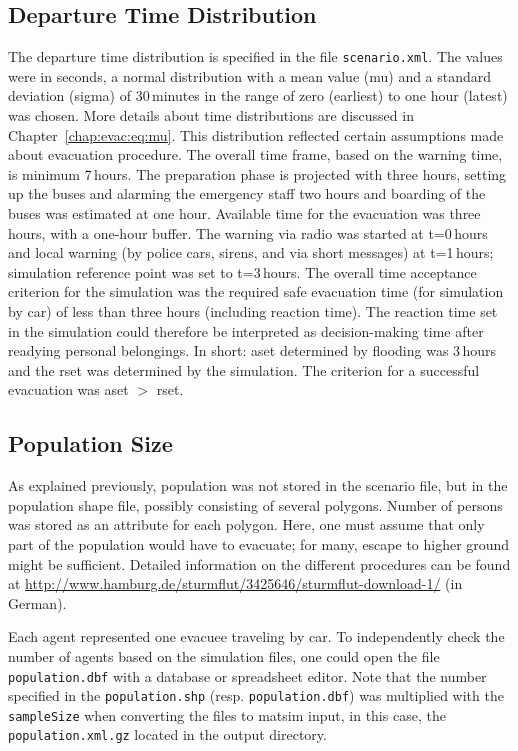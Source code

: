 \subsection{Departure Time Distribution}
The departure time distribution is specified in the file  \lstinline|scenario.xml|. The values were in seconds, \ie a normal distribution with a mean value (mu) and a standard deviation (sigma) of 30\,minutes in the range of zero (earliest) to one hour (latest) was chosen. 
More details about time distributions are discussed in Chapter~\ref{chap:evac:eq:mu}. This distribution reflected certain assumptions made about evacuation procedure. The overall time frame, based on the warning time, is minimum 7\,hours. The preparation phase is projected with three hours, setting up the buses and alarming the emergency staff two hours and boarding of the buses was estimated at one hour. Available time for the evacuation was three hours, with a one-hour buffer. 
The warning via radio was started at t=0\,hours and local warning (\eg by police cars, sirens, and via short messages) at t=1\,hours; simulation reference point was set to t=3\,hours. The overall time acceptance criterion for the simulation was the required safe evacuation time (for simulation by car) of less than three hours (including reaction time). The reaction time set in the simulation could therefore be interpreted as decision-making time after readying personal belongings. In short: \gls{aset} determined by flooding was 3\,hours and the \gls{rset} was determined by the simulation. The criterion for a successful evacuation was \gls{aset} $>$ \gls{rset}.

\subsection{Population Size}
As explained previously, population was not stored in the scenario file, but in the population shape file, possibly consisting of several polygons. Number of persons was stored as an attribute for each polygon. Here, one must assume that only part of the population would have to evacuate; for many, escape to higher ground might be sufficient. Detailed information on the different procedures can be found at \url{http://www.hamburg.de/sturmflut/3425646/sturmflut-download-1/} (in German).

Each agent represented one evacuee traveling by car. To independently check the number of agents based on the simulation files, one could open the file \lstinline|population.dbf| with a database or spreadsheet editor. Note that the number specified in the \lstinline|population.shp| (resp. \lstinline|population.dbf|) was multiplied with the \lstinline|sampleSize| when converting the files to \gls{matsim} input, \ie in this case, the \lstinline|population.xml.gz| located in the output directory.

